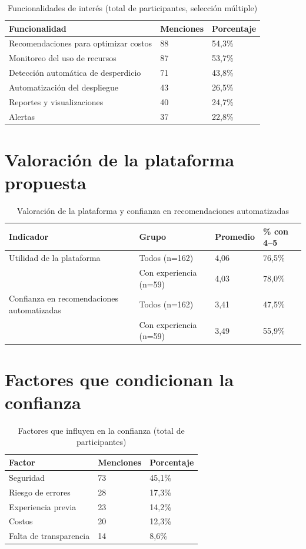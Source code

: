 \documentclass[a4paper, 12pt, oneside, openany]{book}
\begin{document}
\begin{table}[H]
\centering
\scriptsize
\caption{Funcionalidades de interés (total de participantes, selección múltiple)}
\label{tab:enc-funcionalidades}
\begin{tabular}{|p{6cm}|p{2cm}|p{3cm}|}
\hline
\textbf{Funcionalidad} & \textbf{Menciones} & \textbf{Porcentaje} \\
\hline
Recomendaciones para optimizar costos & 88 & 54,3\% \\
Monitoreo del uso de recursos & 87 & 53,7\% \\
Detección automática de desperdicio & 71 & 43,8\% \\
Automatización del despliegue & 43 & 26,5\% \\
Reportes y visualizaciones & 40 & 24,7\% \\
Alertas & 37 & 22,8\% \\
\hline
\end{tabular}
\end{table}

\section{Valoración de la plataforma propuesta}

\begin{table}[H]
\centering
\scriptsize
\caption{Valoración de la plataforma y confianza en recomendaciones automatizadas}
\label{tab:enc-valoracion}
\begin{tabular}{|p{5cm}|p{3.5cm}|p{2cm}|p{2.5cm}|}
\hline
\textbf{Indicador} & \textbf{Grupo} & \textbf{Promedio} & \textbf{\% con 4--5} \\
\hline
Utilidad de la plataforma & Todos (n=162) & 4,06 & 76,5\% \\
& Con experiencia (n=59) & 4,03 & 78,0\% \\
\hline
Confianza en recomendaciones automatizadas & Todos (n=162) & 3,41 & 47,5\% \\
& Con experiencia (n=59) & 3,49 & 55,9\% \\
\hline
\end{tabular}
\end{table}

\section{Factores que condicionan la confianza}

\begin{table}[H]
\centering
\scriptsize
\caption{Factores que influyen en la confianza (total de participantes)}
\label{tab:enc-factores}
\begin{tabular}{|p{6cm}|p{2cm}|p{3cm}|}
\hline
\textbf{Factor} & \textbf{Menciones} & \textbf{Porcentaje} \\
\hline
Seguridad & 73 & 45,1\% \\
Riesgo de errores & 28 & 17,3\% \\
Experiencia previa & 23 & 14,2\% \\
Costos & 20 & 12,3\% \\
Falta de transparencia & 14 & 8,6\% \\
\hline
\end{tabular}
\end{table}
\end{document}
